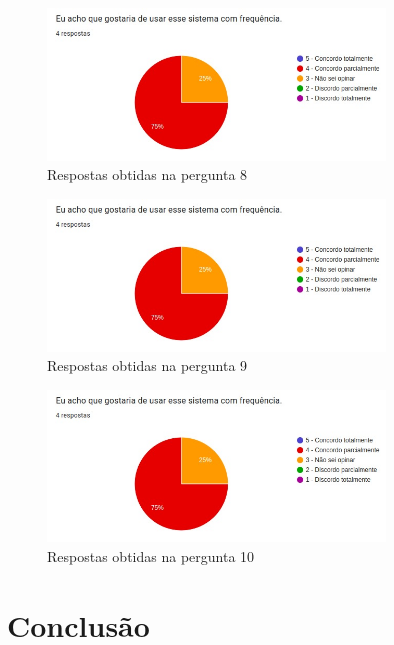 \documentclass[12pt]{tcc}
\begin{document}
\begin{figure}[!ht]
	\centering
	\includegraphics[width=0.8\textwidth]{figures/respostas-pergunta-8.jpeg}
	\caption{Respostas obtidas na pergunta 8}
	\label{fig:respostas-pergunta-8}
\end{figure}

\begin{figure}[!ht]
	\centering
	\includegraphics[width=0.8\textwidth]{figures/respostas-pergunta-9.jpeg}
	\caption{Respostas obtidas na pergunta 9}
	\label{fig:respostas-pergunta-9}
\end{figure}

\begin{figure}[!ht]
	\centering
	\includegraphics[width=0.8\textwidth]{figures/respostas-pergunta-10.jpeg}
	\caption{Respostas obtidas na pergunta 10}
	\label{fig:respostas-pergunta-10}
\end{figure}



\chapter{Conclusão}
\label{cap:conclusão}
\end{document}
